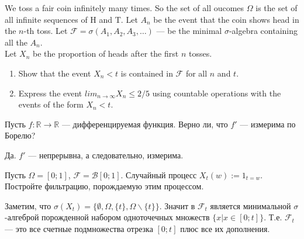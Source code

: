 \begin{problem}
We toss a fair coin infinitely many times. So the set of all oucomes $\Omega$ is the set of all infinite sequences of H and T. Let $A_{n}$ be the event that the coin shows head in the $n$-th toss. Let $\mathcal{F}=\sigma(A_{1},A_{2},A_{3},\ldots)$ — be the minimal $\sigma$-algebra containing all the $A_{n}$. \\
Let $X_{n}$ be the proportion of heads after the first $n$ tosses.
\begin{enumerate}
\item Show that the event $X_{n}<t$ is contained in $\mathcal{F}$ for all $n$ and $t$. \\
\item Express the event $lim_{n\to\infty}X_{n}\le 2/5$ using countable operations with the events of the form $X_{n}<t$.
\end{enumerate}

\begin{sol}

\end{sol}
\end{problem}

\begin{problem}
Пусть $f:\mathbb{R}\to\mathbb{R}$ — дифференцируемая функция. Верно ли, что $f'$ — измерима по Борелю?

\begin{sol}
Да. $ f' $ — непрерывна, а следовательно, измерима.
\end{sol}
\end{problem}

\begin{problem}
Пусть $\Omega=[0;1]$, $ \mathcal{F}=\mathcal{B}[0;1] $. Случайный процесс $X_{t}(w):=1_{t=w}$. Постройте фильтрацию, порождаемую этим процессом.

\begin{sol}
Заметим, что $\sigma(X_{t})=\{\emptyset,\Omega,\{t\},\Omega\backslash\{t\}\}$. Значит в $ \mathcal{F}_{t} $ является минимальной $\sigma  $-алгеброй порожденной набором одноточечных множеств $\{x|x\in [0;t]\}$. Т.е. $\mathcal{F}_{t}$ — это все счетные подмножества отрезка $[0;t]$ плюс все их дополнения.
\end{sol}
\end{problem}

